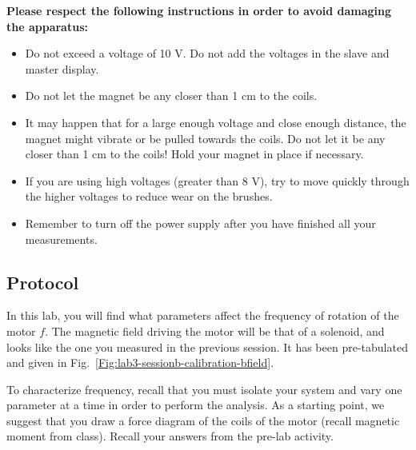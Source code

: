 \documentclass[12pt]{report}
\begin{document}

\large \textbf{Please respect the following instructions in order to avoid damaging the apparatus:} \normalsize
\begin{itemize}
\item Do not exceed a voltage of 10 V. Do not add the voltages in the slave and master display.
\item Do not let the magnet be any closer than 1 cm to the coils.
\item It may happen that for a large enough voltage and close enough distance, the magnet might vibrate or be pulled towards the coils. Do not let it be any closer than 1 cm to the coils! Hold your magnet in place if necessary.
\item If you are using high voltages (greater than 8 V), try to move quickly through the higher voltages to reduce wear on the brushes.
\item Remember to turn off the power supply after you have finished all your measurements.
\end{itemize}


\subsection{Protocol}
In this lab, you will find what parameters affect the frequency of rotation of the motor $f$. The magnetic field driving the motor will be that of a solenoid, and looks like the one you measured in the previous session. It has been pre-tabulated and given in  Fig.~\ref{Fig:lab3-sessionb-calibration-bfield}.

To characterize frequency, recall that you must isolate your system and vary one parameter at a time in order to perform the analysis. As a starting point, we suggest that you draw a force diagram of the coils of the motor (recall magnetic moment from class). Recall your answers from the pre-lab activity.
\end{document}
